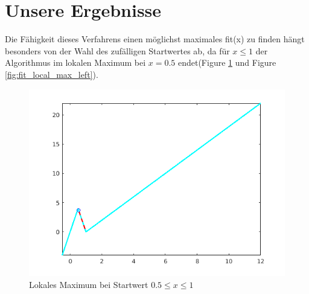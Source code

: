 \documentclass{hbrs-ecta-report}
\begin{document}
\section{Unsere Ergebnisse}
Die Fähigkeit dieses Verfahrens einen möglichst maximales fit(x) zu finden hängt besonders von der Wahl des zufälligen Startwertes ab, da für $x\leq1$ der Algorithmus im lokalen Maximum bei $x=0.5$ endet(Figure \ref{fig:fit_local_max_right} und Figure \ref{fig:fit_local_max_left}).
\begin{figure}[h!]
	\includegraphics[width=0.5\linewidth]{img/plot_fit_local_max_right.png}
	\caption{Lokales Maximum bei Startwert  $0.5 \leq x\leq1$ }
	\label{fig:fit_local_max_right} 
\end{figure}
\end{document}
